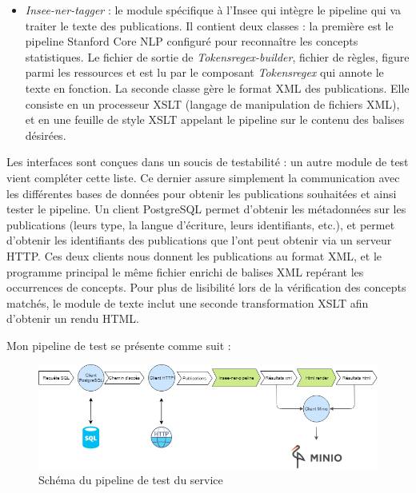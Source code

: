 \begin{itemize}
    \vspace{5pt}
    \item \textit{Insee-ner-tagger} : le module spécifique à l'Insee qui intègre le pipeline qui va traiter le texte des publications. Il contient deux classes : la première est le pipeline Stanford Core NLP configuré pour reconnaître les concepts statistiques. Le fichier de sortie de \textit{Tokensregex-builder}, fichier de règles, figure parmi les ressources et est lu par le composant \textit{Tokensregex} qui annote le texte en fonction. La seconde classe gère le format XML des publications. Elle consiste en un processeur XSLT (langage de manipulation de fichiers XML), et en une feuille de style XSLT appelant le pipeline sur le contenu des balises désirées.
    \newline
\end{itemize}

Les interfaces sont conçues dans un soucis de testabilité : un autre module de test vient compléter cette liste. Ce dernier assure simplement la communication avec les différentes bases de données pour obtenir les publications souhaitées et ainsi tester le pipeline. Un client PostgreSQL permet d'obtenir les métadonnées sur les publications (leurs type, la langue d'écriture, leurs identifiants, etc.), et permet d'obtenir les identifiants des publications que l'ont peut obtenir via un serveur HTTP. Ces deux clients nous donnent les publications au format XML, et le programme principal le même fichier enrichi de balises XML repérant les occurrences de concepts. Pour plus de lisibilité lors de la vérification des concepts matchés, le module de texte inclut une seconde transformation XSLT afin d'obtenir un rendu HTML.
\newline

Mon pipeline de test se présente comme suit :
\vspace{10pt}
\begin{figure}[H]
    \centering
    \includegraphics[scale=0.56]{images/Pipeline-test.png}
    \caption{Schéma du pipeline de test du service}
    \label{fig:pipeline-test}
\end{figure}
\vspace{10pt}

